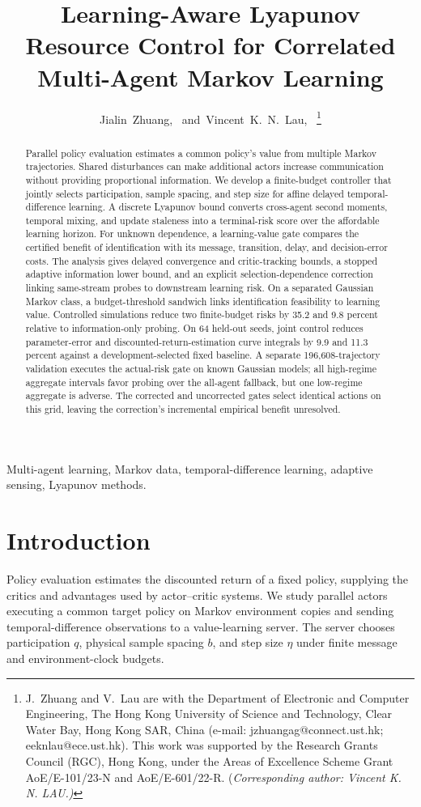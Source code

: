 \documentclass[journal]{IEEEtran}
\title{Learning-Aware Lyapunov Resource Control for Correlated Multi-Agent Markov Learning}
\author{Jialin~Zhuang,~\IEEEmembership{Member,~IEEE,}
and~Vincent~K.~N.~Lau,~\IEEEmembership{Fellow,~IEEE}%
\thanks{J.~Zhuang and V.~Lau are with the Department of Electronic and Computer Engineering, The Hong Kong University of Science and Technology, Clear Water Bay, Hong Kong SAR, China (e-mail: \mbox{jzhuangag@connect.ust.hk}; \mbox{eeknlau@ece.ust.hk}).
This work was supported by the Research Grants Council (RGC), Hong Kong, under the Areas of Excellence Scheme Grant AoE/E-101/23-N and AoE/E-601/22-R.
(\em{Corresponding author: Vincent K. N. LAU}.)}
}
\begin{document}
\maketitle
\begin{abstract}
Parallel policy evaluation estimates a common policy's value from multiple Markov trajectories.
Shared disturbances can make additional actors increase communication without providing proportional information.
We develop a finite-budget controller that jointly selects participation, sample spacing, and step size for affine delayed temporal-difference learning.
A discrete Lyapunov bound converts cross-agent second moments, temporal mixing, and update staleness into a terminal-risk score over the affordable learning horizon.
For unknown dependence, a learning-value gate compares the certified benefit of identification with its message, transition, delay, and decision-error costs.
The analysis gives delayed convergence and critic-tracking bounds, a stopped adaptive information lower bound, and an explicit selection-dependence correction linking same-stream probes to downstream learning risk.
On a separated Gaussian Markov class, a budget-threshold sandwich links identification feasibility to learning value.
Controlled simulations reduce two finite-budget risks by 35.2 and 9.8 percent relative to information-only probing.
On 64 held-out seeds, joint control reduces parameter-error and discounted-return-estimation curve integrals by 9.9 and 11.3 percent against a development-selected fixed baseline.
A separate 196,608-trajectory validation executes the actual-risk gate on known Gaussian models; all high-regime aggregate intervals favor probing over the all-agent fallback, but one low-regime aggregate is adverse.
The corrected and uncorrected gates select identical actions on this grid, leaving the correction's incremental empirical benefit unresolved.
\end{abstract}
\begin{IEEEkeywords}
Multi-agent learning, Markov data, temporal-difference learning, adaptive sensing, Lyapunov methods.
\end{IEEEkeywords}

\section{Introduction}
Policy evaluation estimates the discounted return of a fixed policy, supplying the critics and advantages used by actor--critic systems.
We study parallel actors executing a common target policy on Markov environment copies and sending temporal-difference observations to a value-learning server.
The server chooses participation $q$, physical sample spacing $b$, and step size $\eta$ under finite message and environment-clock budgets.
\end{document}
